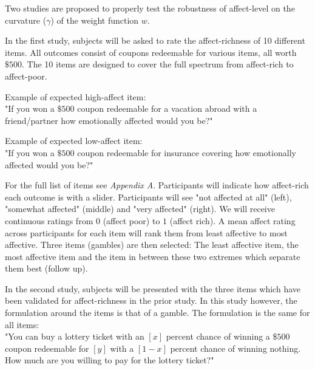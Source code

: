 \documentclass[12pt]{article}
\begin{document}
Two studies are proposed to
properly test the robustness
of affect-level on the
curvature ($\gamma$) of the
weight function $w$.

\vspace{3mm}

In the first study, subjects will be asked to
rate the affect-richness of 10 different
items.
All outcomes
consist of coupons redeemable
for various items, all worth $\$500$.
The 10 items are designed to cover the
full spectrum from affect-rich to
affect-poor.

\vspace{3mm}

Example of expected high-affect item:\\
"If you won a $\$500$ coupon redeemable
for a vacation abroad with a friend/partner
how emotionally
affected would you be?"

\vspace{3mm}

Example of expected low-affect item: \\
"If you won a $\$500$ coupon redeemable
for insurance covering how emotionally
affected would you be?"

\vspace{3mm}

For the full list of items see \emph{Appendix A}.
Participants
will indicate how affect-rich
each outcome is with a slider. Participants will
see "not affected at all" (left),
"somewhat affected" (middle)
and "very affected" (right).
We will receive continuous ratings from $0$
(affect poor) to $1$ (affect rich). A mean
affect rating across participants for each
item will rank them from least affective to
most affective. Three items (gambles) are
then selected: The least affective item,
the most affective item and the item in
between these two extremes which separate them
best (follow up).

\vspace{3mm}

In the second study, subjects will be presented
with the three items which have been validated
for affect-richness in the prior study.
In this study however, the formulation
around the items is that of a gamble.
The formulation is the same
for all items: \\

"You can buy a lottery ticket with an $[x]$
percent chance of winning a $\$500$ coupon
redeemable for $[y]$ with a $[1-x]$ percent
chance of winning nothing. How much are you
willing to pay for the lottery ticket?" \\
\end{document}
